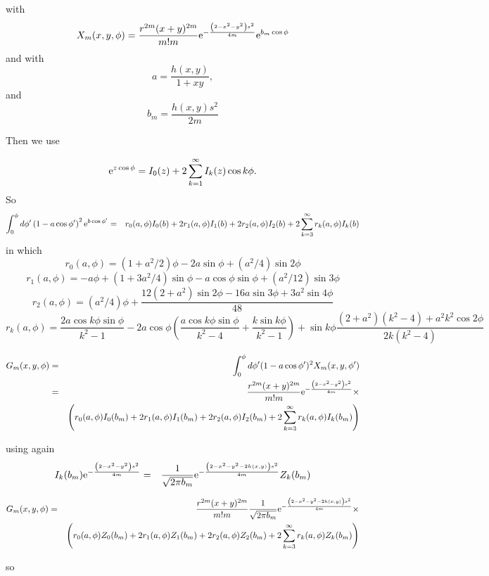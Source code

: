 \documentclass[11pt]{article}
\newcommand{\e}{{\rm e}}
\begin{document}
{{{{with
$$X_{m}(x,y,\phi)=\frac{r^{2m}(x+y)^{2m}}{m!m}\e^{-\frac{\left(2-x^{2}-y^{2}\right)s^{2}}{4m}}\e^{b_{m}\cos\phi}$$
and
with
$$a=\frac{h(x,y)}{1+xy},$$
and
$$b_{m}=\frac{h(x,y)s^{2}}{2m}$$



Then we use

$$\e^{z\cos\phi}=I_{0}(z)+2\sum_{k=1}^{\infty}I_{k}(z)\cos k\phi.$$
So
\begin{eqnarray}
\int_{0}^{\phi}d\phi'\left(1-a\cos\phi' \right)^{2}\e^{b\cos\phi'}&=&
r_{0}(a,\phi)I_{0}(b)+2r_{1}(a,\phi)I_{1}(b)+2r_{2}(a,\phi)I_{2}(b)+2\sum_{k=3}^{\infty}r_{k}(a,\phi)I_{k}(b)
\end{eqnarray}
in which
$$r_{0}(a,\phi)=(1+a^{2}/2)\phi-2a\sin\phi+(a^{2}/4)\sin2\phi$$
$$r_{1}(a,\phi)=-a\phi+(1+3a^{2}/4)\sin\phi-a\cos\phi\sin\phi+(a^{2}/12)\sin3\phi$$
$$r_{2}(a,\phi)=(a^{2}/4)\phi+\frac{12(2+a^{2})\sin2\phi-16a\sin3\phi+3a^{2}\sin4\phi}{48}$$
$$r_{k}(a,\phi)=\frac{2a\cos k\phi\sin\phi}{k^{2}-1}-2a\cos\phi\left(\frac{a\cos k\phi\sin\phi}{k^{2}-4}+\frac{k\sin k\phi}{k^{2}-1}\right)+\sin k\phi\frac{(2+a^{2})(k^{2}-4)+a^{2}k^{2}\cos2\phi}{2k(k^{2}-4)}$$




\begin{eqnarray}
G_{m}(x,y,\phi)&=&\int_{0}^{\phi}d\phi'(1-a\cos\phi')^{2}X_{m}(x,y,\phi')\\&=&\frac{r^{2m}(x+y)^{2m}}{m!m}\e^{-\frac{\left(2-x^{2}-y^{2}\right)s^{2}}{4m}}\times\\&&\left(r_{0}(a,\phi)I_{0}(b_{m})+2r_{1}(a,\phi)I_{1}(b_{m})+2r_{2}(a,\phi)I_{2}(b_{m})+2\sum_{k=3}^{\infty}r_{k}(a,\phi)I_{k}(b_{m})\right)\end{eqnarray}

using again
\begin{eqnarray}
I_{k}(b_{m})\e^{-\frac{\left(2-x^{2}-y^{2}\right)s^{2}}{4m}}&=&\frac{1}{\sqrt{2\pi b_{m}}}\e^{-\frac{\left(2-x^{2}-y^{2}-2h(x,y)\right)s^{2}}{4m}}Z_{k}(b_{m})
\end{eqnarray}

\begin{eqnarray}
G_{m}(x,y,\phi)&=&\frac{r^{2m}(x+y)^{2m}}{m!m}\frac{1}{\sqrt{2\pi b_{m}}}\e^{-\frac{\left(2-x^{2}-y^{2}-2h(x,y)\right)s^{2}}{4m}}\times\\&&\left(r_{0}(a,\phi)Z_{0}(b_{m})+2r_{1}(a,\phi)Z_{1}(b_{m})+2r_{2}(a,\phi)Z_{2}(b_{m})+2\sum_{k=3}^{\infty}r_{k}(a,\phi)Z_{k}(b_{m})\right)\end{eqnarray}

so

}}}}
\end{document}
